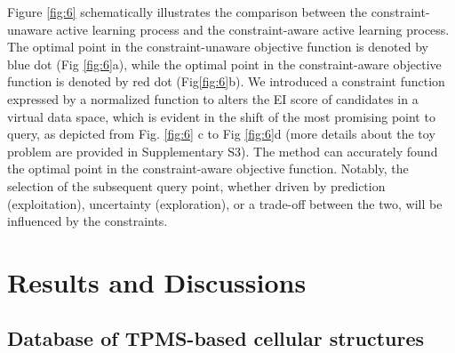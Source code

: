 \documentclass[preprint,review,12pt,authoryear]{elsarticle}
\begin{document}
Figure \ref{fig:6} schematically illustrates the comparison between the constraint-unaware active learning process and the constraint-aware active learning process. The optimal point in the constraint-unaware objective function is denoted by blue dot (Fig \ref{fig:6}a), while the optimal point in the constraint-aware objective function is denoted by red dot (Fig\ref{fig:6}b). We introduced a constraint function expressed by a normalized function to alters the EI score of candidates in a virtual data space, which is evident in the shift of the most promising point to query, as depicted from Fig. \ref{fig:6} c to Fig \ref{fig:6}d (more details about the toy problem are provided in Supplementary S3). The method can accurately found the optimal point in the constraint-aware objective function. Notably, the selection of the subsequent query point, whether driven by prediction (exploitation), uncertainty (exploration), or a trade-off between the two, will be influenced by the constraints. 

\section{Results and Discussions}

\subsection{Database of TPMS-based cellular structures }
\end{document}
